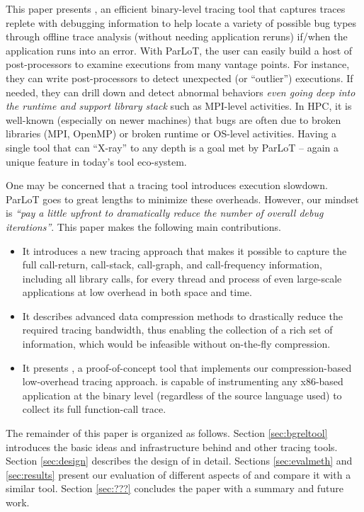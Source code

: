 This paper presents \parlot, an efficient binary-level tracing tool that captures traces 
replete with debugging information to help locate a variety of possible bug types through 
offline trace analysis (without needing application reruns) 
if/when the application runs into an error. 
%
With ParLoT, the user can easily build a host of post-processors to examine
executions from many vantage points.
%
For instance, they can write post-processors
to detect unexpected (or ``outlier'') executions.
%
If needed, they can 
drill down and detect abnormal behaviors {\em even going deep into the runtime and
support library stack} such as MPI-level activities.
%
In HPC, it is well-known (especially on newer machines) that bugs are often due to
broken libraries (MPI, OpenMP) or broken runtime or OS-level activities.
%
Having a single tool that can ``X-ray'' to any depth is a goal met by ParLoT -- again
a unique feature in today's tool eco-system.


One may be concerned that a tracing tool introduces execution slowdown.
%
ParLoT goes to great lengths to minimize these overheads.
%
However, our 
 mindset  is \textit{``pay a little upfront to dramatically reduce the number of overall debug iterations''}. This paper makes the following main contributions.
\begin{itemize}
\item It introduces a new tracing approach that makes it possible to capture the full call-return, call-stack, call-graph, and call-frequency information, including all library calls, for every thread and process of even large-scale applications at low overhead in both space and time.
\item It describes advanced data compression methods to drastically reduce the required tracing bandwidth, thus enabling the collection of a rich set of information, which would be infeasible without on-the-fly compression.
\item It presents \parlot, a proof-of-concept tool that implements our compression-based low-overhead tracing approach. \parlot is capable of instrumenting any x86-based application at the binary level (regardless of the source language used) to collect its full function-call trace.
\end{itemize}
The remainder of this paper is organized as follows. Section \ref{sec:bgreltool} introduces the basic ideas and infrastructure behind \parlot and other tracing tools. Section \ref{sec:design} describes the design of \parlot in detail. Sections \ref{sec:evalmeth} and \ref{sec:results} present our evaluation of different aspects of \parlot and compare it with a similar tool. Section \ref{sec:???} concludes the paper with a summary and future work.


